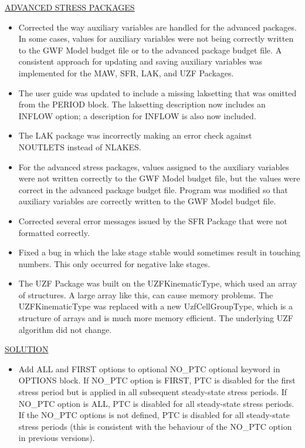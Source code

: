 \begin{itemize}
	\underline{ADVANCED STRESS PACKAGES}
	\begin{itemize}
		\item Corrected the way auxiliary variables are handled for the advanced packages.  In some cases, values for auxiliary variables were not being correctly written to the GWF Model budget file or to the advanced package budget file.  A consistent approach for updating and saving auxiliary variables was implemented for the MAW, SFR, LAK, and UZF Packages.
		\item The user guide was updated to include a missing laksetting that was omitted from the PERIOD block.  The laksetting description now includes an INFLOW option; a description for INFLOW is also now included.
		\item The LAK package was incorrectly making an error check against NOUTLETS instead of NLAKES.
		\item For the advanced stress packages, values assigned to the auxiliary variables were not written correctly to the GWF Model budget file, but the values were correct in the advanced package budget file.  Program was modified so that auxiliary variables are correctly written to the GWF Model budget file.
		\item Corrected several error messages issued by the SFR Package that were not formatted correctly.  
		\item Fixed a bug in which the lake stage stable would sometimes result in touching numbers.  This only occurred for negative lake stages.
		\item The UZF Package was built on the UZFKinematicType, which used an array of structures.  A large array like this, can cause memory problems.  The UZFKinematicType was replaced with a new UzfCellGroupType, which is a structure of arrays and is much more memory efficient.  The underlying UZF algorithm did not change.
	\end{itemize}
	
	\underline{SOLUTION}
	\begin{itemize}
		\item Add ALL and FIRST options to optional NO\_PTC optional keyword in OPTIONS block. If NO\_PTC option is FIRST, PTC is disabled for the first stress period but is applied in all subsequent steady-state stress periods. If NO\_PTC option is ALL, PTC is disabled for all steady-state stress periods. If the NO\_PTC options is not defined, PTC is disabled for all steady-state stress periods (this is consistent with the behaviour of the NO\_PTC option in previous versions).
	\end{itemize}
	

\end{itemize}

